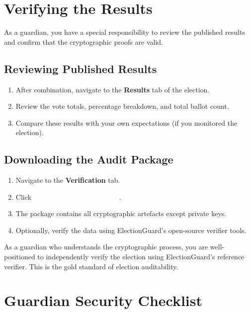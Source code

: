 \documentclass[12pt,a4paper]{book}
\newcommand{\uibutton}[1]{\colorbox{guardgreen}{\textcolor{white}{\small\textbf{#1}}}}
\newcommand{\uimenu}[1]{\textbf{\color{guardgreen}#1}}
\begin{document}
\chapter{Verifying the Results}
\label{ch:guard-verify}

As a guardian, you have a special responsibility to review the published results and confirm that the cryptographic proofs are valid.

\section{Reviewing Published Results}

\begin{enumerate}
  \item After combination, navigate to the \uimenu{Results} tab of the election.
  \item Review the vote totals, percentage breakdown, and total ballot count.
  \item Compare these results with your own expectations (if you monitored the election).
\end{enumerate}

\section{Downloading the Audit Package}

\begin{enumerate}
  \item Navigate to the \uimenu{Verification} tab.
  \item Click \uibutton{Download Election Data}.
  \item The package contains all cryptographic artefacts except private keys.
  \item Optionally, verify the data using ElectionGuard's open-source verifier tools.
\end{enumerate}

\begin{tcolorbox}[tipbox]
As a guardian who understands the cryptographic process, you are well-positioned to independently verify the election using ElectionGuard's reference verifier. This is the gold standard of election auditability.
\end{tcolorbox}

\appendix

\chapter{Guardian Security Checklist}
\end{document}
